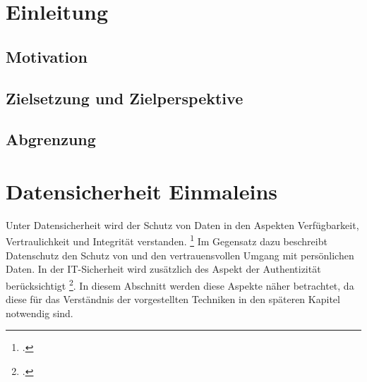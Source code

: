 \documentclass  [paper=a4,
				fontsize=12pt,
				listof=totoc,
				bibliography=totoc
				]{scrreprt}
\begin{document}
	\parindent 0pt %
	
	\pagebreak	%
  \pagestyle{plain}
  \tableofcontents
	\listoffigures %
	\pagebreak
	\listoftables %
	\pagebreak
	\pagebreak
	\setcounter{page}{1} %
		\pagestyle{fancyplain}
		\fancyhf{}							%
		\renewcommand{\headrulewidth}{0.4pt}
		\footskip =30pt
		\renewcommand{\chaptermark}[1]{\markboth{#1}{}}	%
		\rhead{\nouppercase{\leftmark}}	
		\cfoot{\thepage\ / \pageref{LastPage}}

\chapter{Einleitung}
		\section{Motivation}
		\section{Zielsetzung und Zielperspektive}
		\section{Abgrenzung}

	\chapter{Datensicherheit Einmaleins}
	Unter Datensicherheit wird der Schutz von Daten in den Aspekten Verfügbarkeit, Vertraulichkeit und Integrität verstanden. \footcite{BSI2014} Im Gegensatz dazu beschreibt Datenschutz den Schutz von und den vertrauensvollen Umgang mit persönlichen Daten. In der IT-Sicherheit wird zusätzlich des Aspekt der Authentizität berücksichtigt \footcite{Berliner2014}. In diesem Abschnitt werden diese Aspekte näher betrachtet, da diese für das Verständnis der vorgestellten Techniken in den späteren Kapitel notwendig sind.
	
\end{document}
